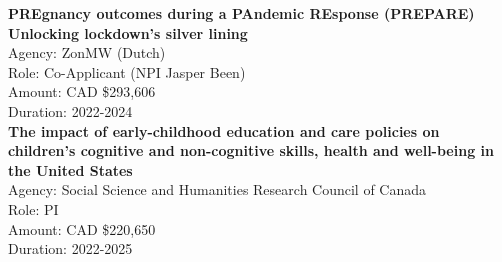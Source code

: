 \documentclass[
  letterpaper,
  DIV=11,
  numbers=noendperiod]{scrartcl}
\begin{document}
\textbf{PREgnancy outcomes during a PAndemic REsponse (PREPARE)
Unlocking lockdown's silver lining}\\
\hspace*{0.333em}\hspace*{0.333em}\hspace*{0.333em}Agency: ZonMW
(Dutch)\\
\hspace*{0.333em}\hspace*{0.333em}\hspace*{0.333em}Role: Co-Applicant
(NPI Jasper Been)\\
\hspace*{0.333em}\hspace*{0.333em}\hspace*{0.333em}Amount: CAD
\$293,606\\
\hspace*{0.333em}\hspace*{0.333em}\hspace*{0.333em}Duration: 2022-2024\\

\textbf{The impact of early-childhood education and care policies on
children's cognitive and non-cognitive skills, health and well-being in
the United States}\\
\hspace*{0.333em}\hspace*{0.333em}\hspace*{0.333em}Agency: Social
Science and Humanities Research Council of Canada\\
\hspace*{0.333em}\hspace*{0.333em}\hspace*{0.333em}Role: PI\\
\hspace*{0.333em}\hspace*{0.333em}\hspace*{0.333em}Amount: CAD
\$220,650\\
\hspace*{0.333em}\hspace*{0.333em}\hspace*{0.333em}Duration: 2022-2025\\
\end{document}
